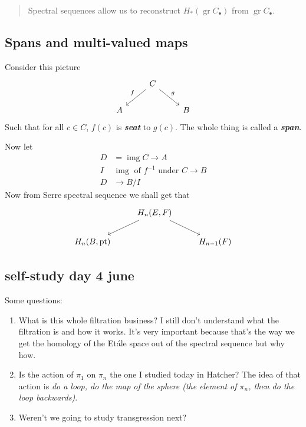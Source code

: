 \documentclass{article}
\DeclareMathOperator{\img}{img}
\DeclareMathOperator{\pt}{pt}
\DeclareMathOperator{\gr}{gr}
\begin{document}
\begin{quotation}
	Spectral sequences allow us to reconstruct $H_*(\gr C_\bullet)$ from $\gr C_\bullet$.
\end{quotation}
\subsection{Spans and multi-valued maps}
Consider this picture
\[\begin{tikzcd}
	&C\arrow[dl,"f",swap]\arrow[dr,"g"]\\
	A&&B
\end{tikzcd}\]
Such that for all $c\in C$, $f(c)$ is \textbf{\textit{seat}} to $g(c)$. The whole thing is called a \textbf{\textit{span}}.

Now let
\begin{align*}
	D&=\img C\to A\\
	I&\img \text{ of }f^{-1}\text{ under }C\to B\\
	D&\to B/I
\end{align*}
Now from Serre spectral sequence we shall get that
\[\begin{tikzcd}
	&H_n(E,F)\arrow[dl]\arrow[dr]\\
	H_n(B,\pt)&&H_{n-1}(F)
\end{tikzcd}\]

\subsection{self-study day 4 june}
Some questions:
\begin{enumerate}
	\item What is this whole filtration business? I still don't understand what the filtration is and how it works. It's very important because that's the way we get the homology of the Etále space out of the spectral sequence but why how.
	\item Is the action of $\pi_1$ on $\pi_n$ the one I studied today in Hatcher? The idea of that action is \textit{do a loop, do the map of the sphere (the element of $\pi_n$, then do the loop backwards)}.
	\item Weren't we going to study transgression next?
\end{enumerate}
\clearpage
\printbibliography
\end{document}
